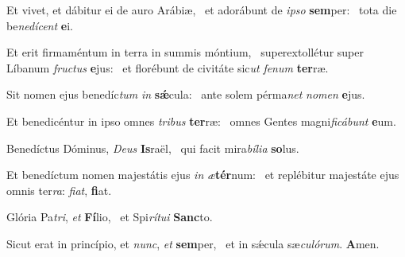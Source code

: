 \item Et vivet, et dábitur ei de auro Arábiæ,~\pscross{} et adorábunt de \textit{ip}\textit{so} \textbf{sem}per:~\psstar{} tota die be\textit{ne}\textit{dí}\textit{cent} \textbf{e}i.
\item Et erit firmaméntum in terra in summis móntium,~\pscross{} superextollétur super Líbanum \textit{fruc}\textit{tus} \textbf{e}jus:~\psstar{} et florébunt de civitáte sic\textit{ut} \textit{fe}\textit{num} \textbf{ter}ræ.
\item Sit nomen ejus benedíc\textit{tum} \textit{in} \textbf{sǽ}cula:~\psstar{} ante solem pérma\textit{net} \textit{no}\textit{men} \textbf{e}jus.
\item Et benedicéntur in ipso omnes \textit{tri}\textit{bus} \textbf{ter}ræ:~\psstar{} omnes Gentes magni\textit{fi}\textit{cá}\textit{bunt} \textbf{e}um.
\item Benedíctus Dóminus, \textit{De}\textit{us} \textbf{Is}raël,~\psstar{} qui facit mira\textit{bí}\textit{li}\textit{a} \textbf{so}lus.
\item Et benedíctum nomen majestátis ejus \textit{in} \textit{æ}\textbf{tér}num:~\psstar{} et replébitur majestáte ejus omnis ter\textit{ra}: \textit{fi}\textit{at}, \textbf{fi}at.
\item Glória Pa\textit{tri}, \textit{et} \textbf{Fí}lio,~\psstar{} et Spi\textit{rí}\textit{tu}\textit{i} \textbf{Sanc}to.
\item Sicut erat in princípio, et \textit{nunc}, \textit{et} \textbf{sem}per,~\psstar{} et in sǽcula sæ\textit{cu}\textit{ló}\textit{rum}. \textbf{A}men.
